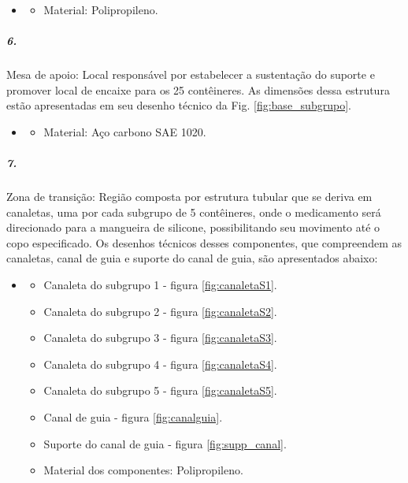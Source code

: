      \begin{itemize}
   \item[]
   \begin{itemize}
       \item  Material: Polipropileno.
   \end{itemize}
   \end{itemize}
      
    

\subparagraph*{6.}\label{retorno_base_subgrupo}
Mesa de apoio: Local responsável por estabelecer a sustentação do suporte e promover local de encaixe para os 25 contêineres. As dimensões dessa estrutura estão apresentadas em seu desenho técnico da Fig. \ref{fig:base_subgrupo}.

\begin{itemize}
   \item[]
   \begin{itemize}
       \item  Material: Aço carbono SAE 1020.
   \end{itemize}
   \end{itemize}
 

\subparagraph*{7.}\label{retorno_zonadetransição}
Zona de transição: Região composta por estrutura tubular que se deriva em canaletas, uma por cada subgrupo de 5 contêineres, onde o medicamento será direcionado para a mangueira de silicone, possibilitando seu movimento até o copo especificado. Os desenhos técnicos desses componentes, que compreendem as canaletas, canal de guia e suporte do canal de guia, são apresentados abaixo:

\begin{itemize}
   \item[]
   \begin{itemize}
       \item Canaleta do subgrupo 1 - figura \ref{fig:canaletaS1}.
       \item Canaleta do subgrupo 2 - figura \ref{fig:canaletaS2}.
       \item Canaleta do subgrupo 3 - figura \ref{fig:canaletaS3}.
       \item Canaleta do subgrupo 4 - figura \ref{fig:canaletaS4}.
       \item Canaleta do subgrupo 5 - figura \ref{fig:canaletaS5}.
       \item Canal de guia - figura \ref{fig:canalguia}.
       \item Suporte do canal de guia - figura \ref{fig:supp_canal}.
       \item Material dos componentes: Polipropileno.
   \end{itemize}
   \end{itemize}

